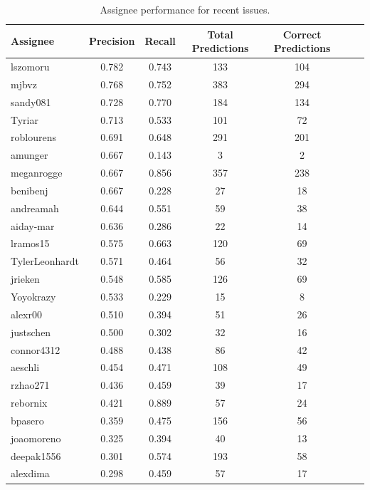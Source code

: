 \documentclass[tikz,10pt,fleqn]{article}
\begin{document}
\begin{table}[H]
    \centering
    \caption{Assignee performance for recent issues.}
    \begin{tabular}{@{}lcccccc@{}}
        \toprule
        Assignee & Precision & Recall & Total Predictions & Correct Predictions \\ \midrule
        lszomoru       & 0.782 & 0.743  & 133 & 104 \\
        mjbvz          & 0.768 & 0.752  & 383 & 294 \\
        sandy081       & 0.728 & 0.770  & 184 & 134 \\
        Tyriar         & 0.713 & 0.533  & 101 & 72  \\
        roblourens     & 0.691 & 0.648  & 291 & 201 \\
        amunger        & 0.667 & 0.143  & 3   & 2   \\
        meganrogge     & 0.667 & 0.856  & 357 & 238 \\
        benibenj       & 0.667 & 0.228  & 27  & 18  \\
        andreamah      & 0.644 & 0.551  & 59  & 38  \\
        aiday-mar      & 0.636 & 0.286  & 22  & 14  \\
        lramos15       & 0.575 & 0.663  & 120 & 69  \\
        TylerLeonhardt & 0.571 & 0.464  & 56  & 32  \\
        jrieken        & 0.548 & 0.585  & 126 & 69  \\
        Yoyokrazy      & 0.533 & 0.229  & 15  & 8   \\
        alexr00        & 0.510 & 0.394  & 51  & 26  \\
        justschen      & 0.500 & 0.302  & 32  & 16  \\
        connor4312     & 0.488 & 0.438  & 86  & 42  \\
        aeschli        & 0.454 & 0.471  & 108 & 49  \\
        rzhao271       & 0.436 & 0.459  & 39  & 17  \\
        rebornix       & 0.421 & 0.889  & 57  & 24  \\
        bpasero        & 0.359 & 0.475  & 156 & 56  \\
        joaomoreno     & 0.325 & 0.394  & 40  & 13  \\
        deepak1556     & 0.301 & 0.574  & 193 & 58  \\
        alexdima       & 0.298 & 0.459  & 57  & 17  \\

\end{tabular}
\end{table}
\end{document}
